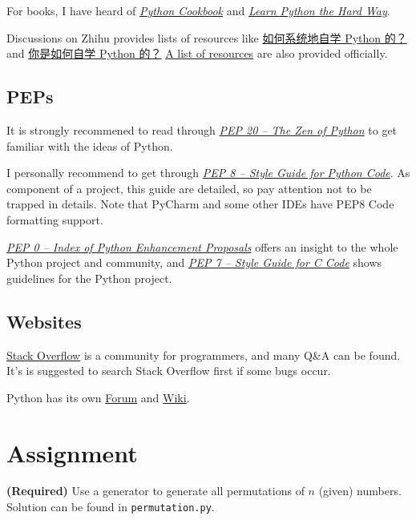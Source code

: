 \documentclass[english]{pkupaper}
\begin{document}
For books, I have heard of \href{https://item.jd.com/11681561.html}{\emph{Python Cookbook}} and \href{http://item.jd.com/11572056.html}{\emph{Learn Python the Hard Way}}.

Discussions on Zhihu provides lists of resources like \href{https://www.zhihu.com/question/29138020}{如何系统地自学 Python 的？} and \href{https://www.zhihu.com/question/20702054}{你是如何自学 Python 的？} \href{https://wiki.python.org/moin/BeginnersGuide/Programmers}{A list of resources} are also provided officially.

\subsection{PEPs}

It is strongly recommened to read through \href{https://www.python.org/dev/peps/pep-0020/}{\emph{PEP 20 -- The Zen of Python}} to get familiar with the ideas of Python.

I personally recommend to get through \href{https://www.python.org/dev/peps/pep-0008/}{\emph{PEP 8 -- Style Guide for Python Code}}. As component of a project, this guide are detailed, so pay attention not to be trapped in details. Note that PyCharm and some other IDEs have PEP8 Code formatting support.

\href{https://www.python.org/dev/peps/}{\emph{PEP 0 -- Index of Python Enhancement Proposals}} offers an insight to the whole Python project and community, and \href{https://www.python.org/dev/peps/pep-0007/}{\emph{PEP 7 -- Style Guide for C Code}} shows guidelines for the Python project.

\subsection{Websites}

\href{https://stackoverflow.com/}{Stack Overflow} is a community for programmers, and many Q\&A can be found. It's is suggested to search Stack Overflow first if some bugs occur.

Python has its own \href{https://python-forum.io/}{Forum} and \href{https://wiki.python.org/moin/FrontPage}{Wiki}.

\section{Assignment}

\begin{thmquestion}
\textbf{(Required)} Use a generator to generate all permutations of $n$ (given) numbers. Solution can be found in \verb"permutation.py".
\end{thmquestion}
\end{document}
